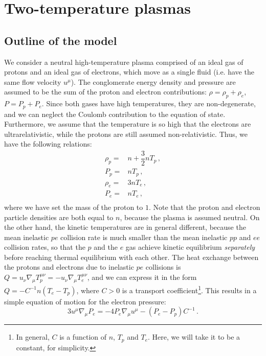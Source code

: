 \documentclass[aps,prl,noshowpacs,noshowkeys,floatfix,superscriptaddress,singlecolum,nofootinbib]{revtex4-2}
\theoremstyle{definition}
\theoremstyle{theorem}
\begin{document}
\newpage
\section{Two-temperature plasmas}

\subsection*{Outline of the model}
We consider a neutral high-temperature plasma comprised of an ideal gas of protons and an ideal gas of electrons, which move as a single fluid (i.e. have the same flow velocity $u^\mu$). The conglomerate energy density and pressure are assumed to be the sum of the proton and electron contributions: $\rho=\rho_p+\rho_e$, $P=P_p+P_e$. Since both gases have high temperatures, they are non-degenerate, and we can neglect the Coulomb contribution to the equation of state. Furthermore, we assume that the temperature is so high that the electrons are ultrarelativistic, while the protons are still assumed non-relativistic. Thus, we have the following relations:
\begin{equation}
    \begin{split}
\rho_p ={}& n+\dfrac{3}{2} nT_p \, , \\
P_p ={}& nT_p \, , \\
\rho_e ={}& 3nT_e \, , \\
P_e ={}& nT_e \, , \\
    \end{split}
\end{equation}
where we have set the mass of the proton to $1$. Note that the proton and electron particle densities are both equal to $n$, because the plasma is assumed neutral. On the other hand, the kinetic temperatures are in general different, because the mean inelastic $pe$ collision rate is much smaller than the mean inelastic $pp$ and $ee$ collision rates, so that the $p$ and the $e$ gas achieve kinetic equilibrium \textit{separately} before reaching thermal equilibrium with each other. The heat exchange between the protons and electrons due to inelastic $pe$ collisions is $Q=u_\nu \nabla_\mu T^{\mu \nu}_p=-u_\nu \nabla_\mu T^{\mu \nu}_e$, and we can express it in the form $Q=-C^{-1}n(T_e-T_p)$, where $C>0$ is a transport coefficient\footnote{In general, $C$ is a function of $n$, $T_p$ and $T_e$. Here, we will take it to be a constant, for simplicity.}. This results in a simple equation of motion for the electron pressure:
\begin{equation}\label{pippuzzuz}
    3 u^\mu \nabla_\mu P_e =-4P_e \nabla_\mu u^\mu -(P_e{-}P_p)C^{-1} \, .
\end{equation}
\end{document}
